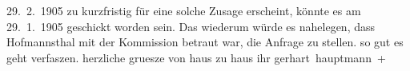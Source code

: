\begin{ledgroupsized}[t]{13cm}
{{{                     29. 2. 1905 zu kurzfristig für eine solche Zusage erscheint,
                  könnte es am 29. 1. 1905 geschickt worden sein. Das wiederum würde es
                  nahelegen, dass Hofmannsthal mit der
                  Kommission betraut war, die Anfrage zu stellen.}}}\label{K_L01496_1h} so gut es geht verfaszen.
               herzliche gruesze von haus zu haus ihr \spacefill\mbox{gerhart hauptmann +}\pend
           \endnumbering{}\end{ledgroupsized}  \newcommand{\dateiname}{L01496}\newcommand{\titel}{Gerhart Hauptmann an Arthur Schnitzler, 29. [1. 1905?]}\newcommand{\editorInnen}{Martin Anton Müller und Gerd-Hermann Susen}
            \footnotesize
\begin{ledgroupsized}[t]{11.5cm}
\end{ledgroupsized}
         
      